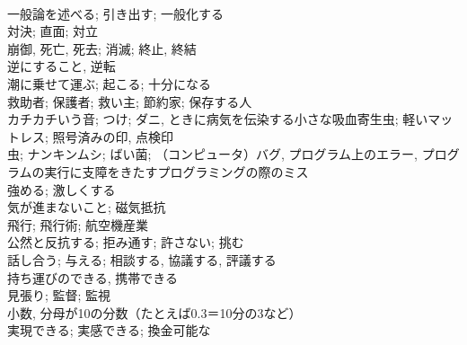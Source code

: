 \documentclass[8pt]{extreport}
\begin{document}
\begin{CJK}{UTF8}{min}
\\	一般論を述べる; 引き出す; 一般化する	
\\	対決; 直面; 対立	
\\	崩御, 死亡, 死去; 消滅; 終止, 終結	
\\	逆にすること, 逆転	
\\	潮に乗せて運ぶ; 起こる; 十分になる	
\\	救助者; 保護者; 救い主; 節約家; 保存する人	
\\	カチカチいう音; つけ; ダニ, ときに病気を伝染する小さな吸血寄生虫; 軽いマットレス; 照号済みの印, 点検印	
\\	虫; ナンキンムシ; ばい菌; （コンピュータ）バグ, プログラム上のエラー, プログラムの実行に支障をきたすプログラミングの際のミス	
\\	強める; 激しくする	
\\	気が進まないこと; 磁気抵抗	
\\	飛行; 飛行術; 航空機産業	
\\	公然と反抗する; 拒み通す; 許さない; 挑む	
\\	話し合う; 与える; 相談する, 協議する, 評議する	
\\	持ち運びのできる, 携帯できる	
\\	見張り; 監督; 監視	
\\	小数, 分母が10の分数（たとえば0.3＝10分の3など）	
\\	実現できる; 実感できる; 換金可能な	
\end{CJK}
\end{document}
